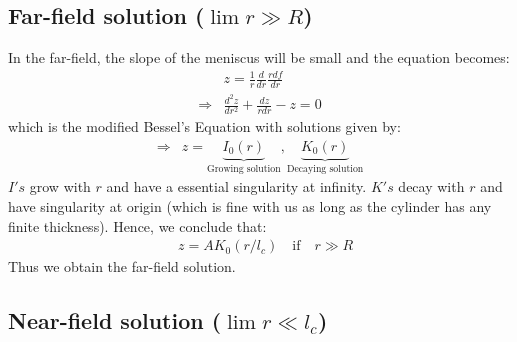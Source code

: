 \documentclass[11pt,a4paper]{article}
\newcommand{\describe}[2]{\underbrace{#2}_{\text{#1}}}%
\newcommand{\1}{\vect{1}}
\newcommand{\RR}{\Rightarrow}
\begin{document}
\subsection*{Far-field solution ($\lim r \gg R$)}

In the far-field, the slope of the meniscus will be small and the equation becomes:
\begin{align*}
&z = \frac 1 r\frac{d}{dr}\frac{rdf}{dr}\\
\Rightarrow& \frac{d^2z}{dr^2} +\frac{dz}{rdr} - z = 0 \tag{using $z=f(r)$}
\end{align*}
which is the modified Bessel's Equation with solutions given by:
\begin{align*}
\RR &z = \describe{Growing solution}{I_0(r)}, \describe{Decaying solution}{K_0(r)}
\end{align*}
$I's$ grow with $r$ and have a essential singularity at infinity. $K's$ decay with $r$ and have singularity at origin (which is fine with us as long as the cylinder has any finite thickness). Hence, we conclude that:
\begin{align*}
&z = A K_0(r/l_c) \quad \text{if} \quad r \gg R
\end{align*}
Thus we obtain the far-field solution. 

\subsection*{Near-field solution ($\lim r \ll l_c$)}
\end{document}
